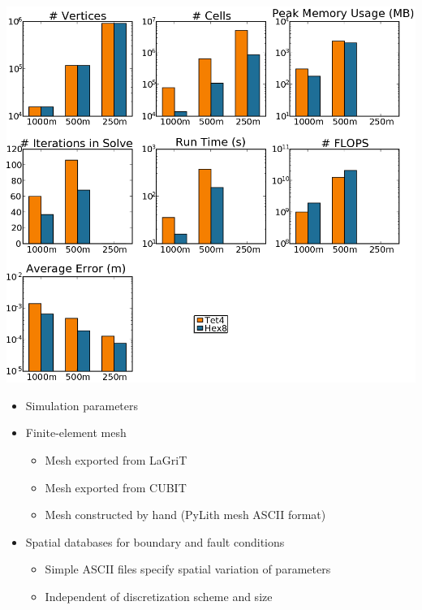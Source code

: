 \documentclass[pdftex,cig,slideColor]{pp4slides}
\begin{document}

  \vfill
  \begin{center}
    \includegraphics[scale=0.5]{figs/benchmark_summary}
  \end{center}
  

  \begin{itemize}
  \item Simulation parameters
  \item Finite-element mesh
    \begin{itemize}
    \item Mesh exported from LaGriT
    \item Mesh exported from CUBIT
    \item Mesh constructed by hand (PyLith mesh ASCII format)
    \end{itemize}
  \item Spatial databases for boundary and fault conditions
    \begin{itemize}
    \item Simple ASCII files specify spatial variation of parameters
    \item Independent of discretization scheme and size
    \end{itemize}
  \end{itemize}
\end{document}
